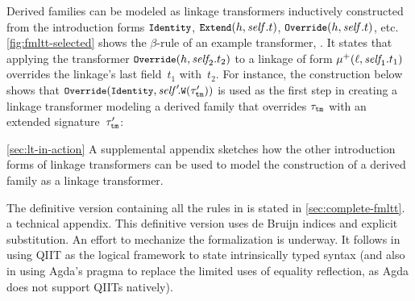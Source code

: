 Derived families can be modeled as linkage transformers inductively
constructed from the introduction forms
$\small\texttt{Identity}$, $\small\texttt{Extend}({h},{\mathit{self}.t})$, $\small\texttt{Override}({h},{\mathit{self}.t})$, %
etc.
\cref{fig:fmltt-selected} shows the $\beta$-rule of an example transformer,
.
It states that applying the transformer $\small\texttt{Override}({h},{\mathit{self}_{\!2}.t_2})$ to
a linkage of form $\mu^+({\ell},{\mathit{self}_{\!1}.t_1})$
overrides the linkage's last field~$t_1$ with~$t_2$.
For instance, the construction below shows that 
$\small\texttt{Override}({\texttt{Identity}},{\mathit{self}'\!.\texttt{W}({\tau'_{\texttt{tm}}})})$
is used as the first step in creating a linkage transformer modeling a derived family that
overrides $\tau_{\texttt{tm}}$ with an extended
signature~$\tau'_{\texttt{tm}}$:
\vspace{.9ex}

\noindent


\noindent
\ifreport \cref{sec:lt-in-action}
\else A supplemental appendix
\fi
sketches how the other introduction forms of linkage transformers
can be used to model the construction of a derived family as a linkage transformer.



The definitive version containing all the rules in \TT is stated in
\ifreport \cref{sec:complete-fmltt}.
\else a technical appendix.
\fi
This definitive version uses de Bruijn indices and explicit substitution.
An effort to mechanize the formalization is underway. It follows \citet{altkap2016}
in using \ac{QIIT} as 
the logical framework to state intrinsically typed syntax (and also
in using Agda's  pragma to replace the limited uses of equality
reflection, as Agda does not support QIITs natively).


%


